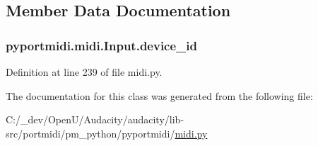\subsection{Member Data Documentation}
\subsubsection[{\texorpdfstring{device\+\_\+id}{device_id}}]{\setlength{\rightskip}{0pt plus 5cm}pyportmidi.\+midi.\+Input.\+device\+\_\+id}\hypertarget{classpyportmidi_1_1midi_1_1_input_a4222850ca83a04bc75ac5549caa5644c}{}\label{classpyportmidi_1_1midi_1_1_input_a4222850ca83a04bc75ac5549caa5644c}


Definition at line 239 of file midi.\+py.



The documentation for this class was generated from the following file\+:\begin{DoxyCompactItemize}
\item 
C\+:/\+\_\+dev/\+Open\+U/\+Audacity/audacity/lib-\/src/portmidi/pm\+\_\+python/pyportmidi/\hyperlink{midi_8py}{midi.\+py}\end{DoxyCompactItemize}

